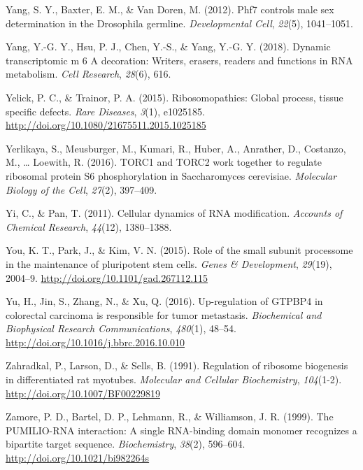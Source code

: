 \documentclass[12pt,oneside]{reedthesis}
\newlength{\cslhangindent}
\newenvironment{cslreferences}%
  {\setlength{\parindent}{0pt}%
  \everypar{\setlength{\hangindent}{\cslhangindent}}\ignorespaces}%
  {\par}
\begin{document}
\begin{cslreferences}
\leavevmode\hypertarget{ref-Yang2012}{}%
Yang, S. Y., Baxter, E. M., \& Van Doren, M. (2012). Phf7 controls male sex determination in the Drosophila germline. \emph{Developmental Cell}, \emph{22}(5), 1041--1051.

\leavevmode\hypertarget{ref-Yang2018}{}%
Yang, Y.-G. Y., Hsu, P. J., Chen, Y.-S., \& Yang, Y.-G. Y. (2018). Dynamic transcriptomic m 6 A decoration: Writers, erasers, readers and functions in RNA metabolism. \emph{Cell Research}, \emph{28}(6), 616.

\leavevmode\hypertarget{ref-Yelick2015a}{}%
Yelick, P. C., \& Trainor, P. A. (2015). Ribosomopathies: Global process, tissue specific defects. \emph{Rare Diseases}, \emph{3}(1), e1025185. \url{http://doi.org/10.1080/21675511.2015.1025185}

\leavevmode\hypertarget{ref-Yerlikaya2016a}{}%
Yerlikaya, S., Meusburger, M., Kumari, R., Huber, A., Anrather, D., Costanzo, M., \ldots{} Loewith, R. (2016). TORC1 and TORC2 work together to regulate ribosomal protein S6 phosphorylation in Saccharomyces cerevisiae. \emph{Molecular Biology of the Cell}, \emph{27}(2), 397--409.

\leavevmode\hypertarget{ref-Yi2011}{}%
Yi, C., \& Pan, T. (2011). Cellular dynamics of RNA modification. \emph{Accounts of Chemical Research}, \emph{44}(12), 1380--1388.

\leavevmode\hypertarget{ref-You2015}{}%
You, K. T., Park, J., \& Kim, V. N. (2015). Role of the small subunit processome in the maintenance of pluripotent stem cells. \emph{Genes \& Development}, \emph{29}(19), 2004--9. \url{http://doi.org/10.1101/gad.267112.115}

\leavevmode\hypertarget{ref-yuUpregulationGTPBP4Colorectal2016}{}%
Yu, H., Jin, S., Zhang, N., \& Xu, Q. (2016). Up-regulation of GTPBP4 in colorectal carcinoma is responsible for tumor metastasis. \emph{Biochemical and Biophysical Research Communications}, \emph{480}(1), 48--54. \url{http://doi.org/10.1016/j.bbrc.2016.10.010}

\leavevmode\hypertarget{ref-zahradkalRegulationRibosomeBiogenesis1991}{}%
Zahradkal, P., Larson, D., \& Sells, B. (1991). Regulation of ribosome biogenesis in differentiated rat myotubes. \emph{Molecular and Cellular Biochemistry}, \emph{104}(1-2). \url{http://doi.org/10.1007/BF00229819}

\leavevmode\hypertarget{ref-Zamore1999b}{}%
Zamore, P. D., Bartel, D. P., Lehmann, R., \& Williamson, J. R. (1999). The PUMILIO-RNA interaction: A single RNA-binding domain monomer recognizes a bipartite target sequence. \emph{Biochemistry}, \emph{38}(2), 596--604. \url{http://doi.org/10.1021/bi982264s}


\end{cslreferences}
\end{document}
